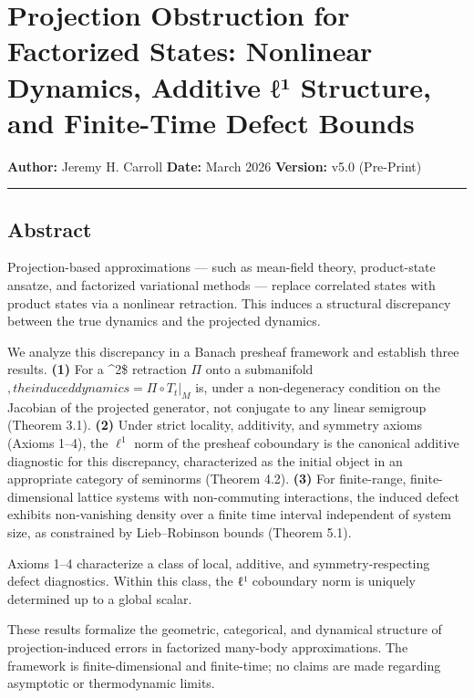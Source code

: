 \documentclass[
]{article}
\author{}
\date{}
\begin{document}
\section{Projection Obstruction for Factorized States: Nonlinear
Dynamics, Additive ℓ¹ Structure, and Finite-Time Defect
Bounds}\label{projection-obstruction-for-factorized-states-nonlinear-dynamics-additive-ux2113uxb9-structure-and-finite-time-defect-bounds}

\textbf{Author:} Jeremy H. Carroll \textbf{Date:} March 2026
\textbf{Version:} v5.0 (Pre-Print)

\begin{center}\rule{0.5\linewidth}{0.5pt}\end{center}

\subsection{Abstract}\label{abstract}

Projection-based approximations --- such as mean-field theory,
product-state ansatze, and factorized variational methods --- replace
correlated states with product states via a nonlinear retraction. This
induces a structural discrepancy between the true dynamics and the
projected dynamics.

We analyze this discrepancy in a Banach presheaf framework and establish
three results. \textbf{(1)} For a \^{}2\$ retraction \(\Pi\) onto a
submanifold \(, the induced dynamics  = \Pi \circ T_t|_M\) is, under a
non-degeneracy condition on the Jacobian of the projected generator, not
conjugate to any linear semigroup (Theorem 3.1). \textbf{(2)} Under
strict locality, additivity, and symmetry axioms (Axioms 1--4), the
\(\ell^1\) norm of the presheaf coboundary is the canonical additive
diagnostic for this discrepancy, characterized as the initial object in
an appropriate category of seminorms (Theorem 4.2). \textbf{(3)} For
finite-range, finite-dimensional lattice systems with non-commuting
interactions, the induced defect exhibits non-vanishing density over a
finite time interval independent of system size, as constrained by
Lieb--Robinson bounds (Theorem 5.1).

Axioms 1--4 characterize a class of local, additive, and
symmetry-respecting defect diagnostics. Within this class, the ℓ¹
coboundary norm is uniquely determined up to a global scalar.

These results formalize the geometric, categorical, and dynamical
structure of projection-induced errors in factorized many-body
approximations. The framework is finite-dimensional and finite-time; no
claims are made regarding asymptotic or thermodynamic limits.
\end{document}
